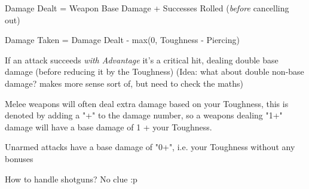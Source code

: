 Damage Dealt = Weapon Base Damage + Successes Rolled (\textit{before} cancelling out)

Damage Taken = Damage Dealt - max(0, Toughness - Piercing) 

If an attack succeeds \textit{with Advantage} it's a critical hit, dealing double base damage (before reducing it by the Toughness)
(Idea: what about double non-base damage? makes more sense sort of, but need to check the maths)

Melee weapons will often deal extra damage based on your Toughness, this is denoted by adding a "+" to the damage number, so a weapons dealing "1+" damage will have a base damage of 1 + your Toughness.

Unarmed attacks have a base damage of "0+", i.e. your Toughness without any bonuses


How to handle shotguns? No clue :p


